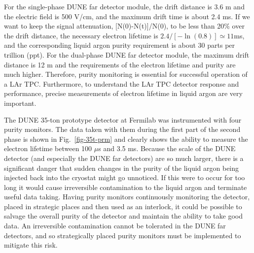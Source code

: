 
For the single-phase DUNE far detector module, the drift distance is 3.6 m and the electric field is 500 V/cm, and the maximum drift time is about 2.4 ms. If we want to keep the signal attenuation, [N(0)-N(t)]/N(0), to be less than  20\% over the drift distance, the necessary electron lifetime is $2.4/[-\ln(0.8)] \simeq 11 $ms, and the corresponding liquid argon purity requirement is about 30 parts per trillion (ppt). For the dual-phase DUNE far detector module, the maximum drift distance is 12 m and the requirements of the electron lifetime and purity are much higher. Therefore, purity monitoring is essential for successful operation of a LAr TPC. Furthermore, to understand the LAr TPC detector response and performance, precise measurements of electron lifetime in liquid argon are very important.

The DUNE 35-ton prototype detector at Fermilab was instrumented with four purity monitors. The data taken with them during the first part of the second phase is shown in Fig.~\ref{fig-35t-prm} and clearly shows the ability to measure the electron lifetime between 100 $\mu$s and 3.5 ms.  Because the scale of the DUNE detector (and especially the DUNE far detectors) are so much larger, there is a significant danger that sudden changes in the purity of the liquid argon being injected back into the cryostat might go unnoticed. If this were to occur for too long it would cause irreversible contamination to the liquid argon and terminate useful data taking.  Having purity monitors continuously monitoring the detector, placed in strategic places and then used as an interlock, it could be possible to salvage the overall purity of the detector and maintain the ability to take good data. An irreversible contamination cannot be tolerated in the DUNE far detectors, and so strategically placed purity monitors must be implemented to mitigate this risk. 



